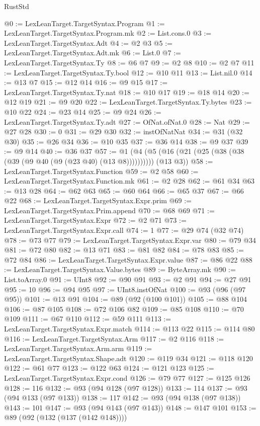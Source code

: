 \begin{lexlean}{RustStd}
\begin{coremodule}
@0 := LexLeanTarget.TargetSyntax.Program
@1 := LexLeanTarget.TargetSyntax.Program.mk
@2 := List.cons.{0}
@3 := LexLeanTarget.TargetSyntax.Adt
@4 := @2 @3
@5 := LexLeanTarget.TargetSyntax.Adt.mk
@6 := List.{0}
@7 := LexLeanTarget.TargetSyntax.Ty
@8 := @6 @7
@9 := @2 @8
@10 := @2 @7
@11 := LexLeanTarget.TargetSyntax.Ty.bool
@12 := @10 @11
@13 := List.nil.{0}
@14 := @13 @7
@15 := @12 @14
@16 := @9 @15
@17 := LexLeanTarget.TargetSyntax.Ty.nat
@18 := @10 @17
@19 := @18 @14
@20 := @12 @19
@21 := @9 @20
@22 := LexLeanTarget.TargetSyntax.Ty.bytes
@23 := @10 @22
@24 := @23 @14
@25 := @9 @24
@26 := LexLeanTarget.TargetSyntax.Ty.adt
@27 := OfNat.ofNat.{0}
@28 := Nat
@29 := @27 @28
@30 := 0
@31 := @29 @30
@32 := instOfNatNat
@34 := @31 (@32 @30)
@35 := @26 @34
@36 := @10 @35
@37 := @36 @14
@38 := @9 @37
@39 := @9 @14
@40 := @36 @37
@57 := @1 (@4 (@5 (@16 (@21 (@25 (@38 (@38 (@39 (@9 @40 (@9 (@23 @40) (@13 @8)))))))))) (@13 @3))
@58 := LexLeanTarget.TargetSyntax.Function
@59 := @2 @58
@60 := LexLeanTarget.TargetSyntax.Function.mk
@61 := @2 @28
@62 := @61 @34
@63 := @13 @28
@64 := @62 @63
@65 := @60 @64
@66 := @65 @37
@67 := @66 @22
@68 := LexLeanTarget.TargetSyntax.Expr.prim
@69 := LexLeanTarget.TargetSyntax.Prim.append
@70 := @68 @69
@71 := LexLeanTarget.TargetSyntax.Expr
@72 := @2 @71
@73 := LexLeanTarget.TargetSyntax.Expr.call
@74 := 1
@77 := @29 @74 (@32 @74)
@78 := @73 @77
@79 := LexLeanTarget.TargetSyntax.Expr.var
@80 := @79 @34
@81 := @72 @80
@82 := @13 @71
@83 := @81 @82
@84 := @78 @83
@85 := @72 @84
@86 := LexLeanTarget.TargetSyntax.Expr.value
@87 := @86 @22
@88 := LexLeanTarget.TargetSyntax.Value.bytes
@89 := ByteArray.mk
@90 := List.toArray.{0}
@91 := UInt8
@92 := @90 @91
@93 := @2 @91
@94 := @27 @91
@95 := 10
@96 := @94 @95
@97 := UInt8.instOfNat
@100 := @93 (@96 (@97 @95))
@101 := @13 @91
@104 := @89 (@92 (@100 @101))
@105 := @88 @104
@106 := @87 @105
@108 := @72 @106 @82
@109 := @85 @108
@110 := @70 @109
@111 := @67 @110
@112 := @59 @111
@113 := LexLeanTarget.TargetSyntax.Expr.match
@114 := @113 @22
@115 := @114 @80
@116 := LexLeanTarget.TargetSyntax.Arm
@117 := @2 @116
@118 := LexLeanTarget.TargetSyntax.Arm.arm
@119 := LexLeanTarget.TargetSyntax.Shape.adt
@120 := @119 @34
@121 := @118 @120
@122 := @61 @77
@123 := @122 @63
@124 := @121 @123
@125 := LexLeanTarget.TargetSyntax.Expr.cond
@126 := @79 @77
@127 := @125 @126
@128 := 116
@132 := @93 (@94 @128 (@97 @128))
@133 := 114
@137 := @93 (@94 @133 (@97 @133))
@138 := 117
@142 := @93 (@94 @138 (@97 @138))
@143 := 101
@147 := @93 (@94 @143 (@97 @143))
@148 := @147 @101
@153 := @89 (@92 (@132 (@137 (@142 @148))))

\end{coremodule}
\end{lexlean}
